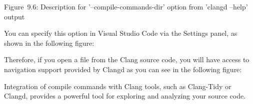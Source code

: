 \begin{center}
Figure 9.6: Description for '–compile-commands-dir' option from 'clangd –help' output
\end{center}

You can specify this option in Visual Studio Code via the Settings panel, as shown in the following figure:


Therefore, if you open a file from the Clang source code, you will have access to navigation support provided by Clangd as you can see in the following figure:


Integration of compile commands with Clang tools, such as Clang-Tidy or Clangd, provides a powerful tool for exploring and analyzing your source code.





















